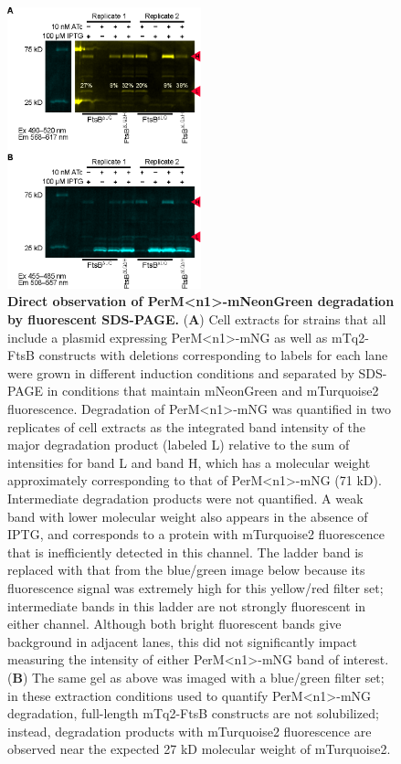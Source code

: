 \documentclass[pdflatex,sn-nature]{sn-jnl}%
\def\textsuperscript#1{<#1>}%
\newcommand\permN{PerM\textsuperscript{n1}}
\begin{document}
\begin{appendices}
\begin{figure}[htb]
    \centering
    \includegraphics[width=0.5\textwidth]{./figS4.eps}
    \caption{\textbf{Direct observation of \permN{}-mNeonGreen degradation by fluorescent SDS-PAGE.}
    (\textbf{A}) Cell extracts for strains that all include a plasmid expressing \permN{}-mNG as well as mTq2-FtsB constructs with deletions corresponding to labels for each lane were grown in different induction conditions and separated by SDS-PAGE in conditions that maintain mNeonGreen and mTurquoise2 fluorescence. Degradation of \permN{}-mNG was quantified in two replicates of cell extracts as the integrated band intensity of the major degradation product (labeled L) relative to the sum of intensities for band L and band H, which has a molecular weight approximately corresponding to that of \permN{}-mNG (71 kD). Intermediate degradation products were not quantified. A weak band with lower molecular weight also appears in the absence of IPTG, and corresponds to a protein with mTurquoise2 fluorescence that is inefficiently detected in this channel. The ladder band is replaced with that from the blue/green image below because its fluorescence signal was extremely high for this yellow/red filter set; intermediate bands in this ladder are not strongly fluorescent in either channel. Although both bright fluorescent bands give background in adjacent lanes, this did not significantly impact measuring the intensity of either \permN{}-mNG band of interest.
    (\textbf{B}) The same gel as above was imaged with a blue/green filter set; in these extraction conditions used to quantify \permN{}-mNG degradation, full-length mTq2-FtsB constructs are not solubilized; instead, degradation products with mTurquoise2 fluorescence are observed near the expected 27 kD molecular weight of mTurquoise2.
    }\label{figS4}
    \end{figure}

\end{appendices}
\end{document}
